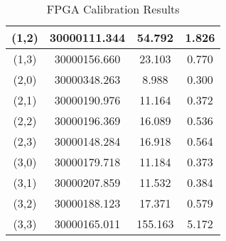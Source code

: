 \begin{table}
\begin{center}
\begin{tabular}{|c|c|c|c|}
			\hline
			(1,2) & 30000111.344 & 54.792 & 1.826 \\
			\hline
			(1,3) & 30000156.660 & 23.103 & 0.770 \\
			\hline
			(2,0) & 30000348.263 & 8.988 & 0.300 \\
			\hline
			(2,1) & 30000190.976 & 11.164 & 0.372 \\
			\hline
			(2,2) & 30000196.369 & 16.089 & 0.536 \\
			\hline
			(2,3) & 30000148.284 & 16.918 & 0.564 \\
			\hline
			(3,0) & 30000179.718 & 11.184 & 0.373 \\
			\hline
			(3,1) & 30000207.859 & 11.532 & 0.384 \\
			\hline
			(3,2) & 30000188.123 & 17.371 & 0.579 \\
			\hline
			(3,3) & 30000165.011 & 155.163 & 5.172 \\
			\hline
		\end{tabular}
	\end{center}
	\caption{FPGA Calibration Results}
	\label{tab:fpga_slow_calibration}
\end{table}